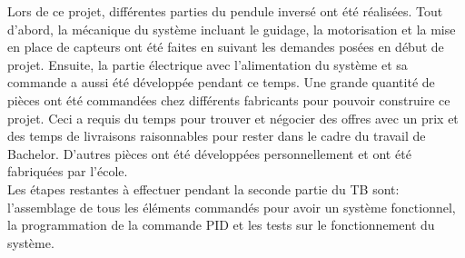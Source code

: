 Lors de ce projet, différentes parties du pendule inversé ont été réalisées. Tout d'abord, la mécanique du système incluant le guidage, la motorisation
et la mise en place de capteurs ont été faites en suivant les demandes posées en début de projet. Ensuite, la partie électrique avec l'alimentation du
système et sa commande a aussi été développée pendant ce temps. Une grande quantité de pièces ont été commandées chez différents fabricants pour
pouvoir construire ce projet. Ceci a requis du temps pour trouver et négocier des offres avec un prix et des temps de livraisons raisonnables
pour rester dans le cadre du travail de Bachelor. D'autres pièces ont été développées personnellement et ont été fabriquées par l'école.\\

Les étapes restantes à effectuer pendant la seconde partie du \acrshort{TB} sont: l'assemblage de tous les éléments commandés pour avoir un
système fonctionnel, la programmation de la commande \gls{PID} et les tests sur le fonctionnement du système.